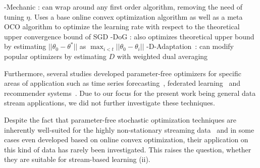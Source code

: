 \documentclass[letterpaper]{article} %
\begin{document}
-Mechanic \cite{cutkoskyMechanicLearningRate2023}: can wrap around any first order algorithm, removing the need of tuning $\eta$. Uses a base online convex optimization algorithm as well as a meta OCO algorithm to optimize the learning rate with respect to the theoretical upper convergence bound of SGD
-DoG \cite{ivgiDoGSGDBest2023}: also optimizes theoretical upper bound by estimating $||\theta_0 - \theta^*||$ as $\max_{i<t}||\theta_0 - \theta_i||$
-D-Adaptation~\cite{defazioLearningRateFreeLearningDAdaptation2023a}: can modify popular optimizers by estimating $D$ with weighted dual averaging~\cite{duchiDualAveragingDistributed2012}


Furthermore, several studies developed parameter-free optimizers for specific areas of application such as time series forecasting~\cite{miyaguchiCograConceptDriftAwareStochastic2019,fekriDeepLearningLoad2021, zhangPOLAOnlineTime2021a}, federated learning~\cite{canonacoAdaptiveFederatedLearning2021} and recommender systems~\cite{ferreirajoseADADRIFTAdaptiveLearning2020}.
Due to our focus for the present work being general data stream applications, we did not further investigate these techniques.

Despite the fact that parameter-free stochastic optimization techniques are inherently well-suited for the highly non-stationary streaming data~\cite{schaulNoMorePesky2013} and in some cases even developed based on online convex optimization, their application on this kind of data has rarely been investigated.
This raises the question, whether they are suitable for stream-based learning (ii).
\end{document}
